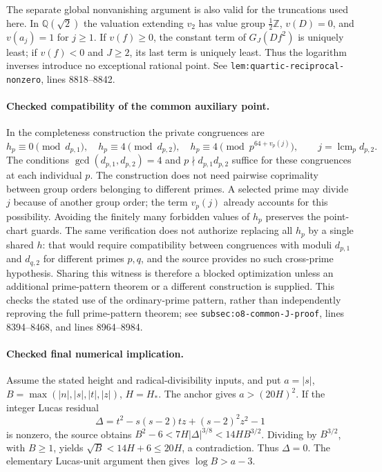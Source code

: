 \documentclass[11pt]{article}
\theoremstyle{definition}
\begin{document}
The separate global nonvanishing argument is also valid for the
truncations used here.  In $\mathbb Q(\sqrt2)$ the valuation extending
$v_2$ has value group $\frac12\mathbb Z$, $v(D)=0$, and $v(a_j)=1$
for $j\ge1$.  If $v(f)\ge0$, the constant term of $G_J(Df^2)$
is uniquely least; if $v(f)<0$ and $J\ge2$, its last term is uniquely
least.  Thus the logarithm inverses introduce no exceptional rational
point.  See \nolinkurl{lem:quartic-reciprocal-nonzero}, lines 8818--8842.

\paragraph{Checked compatibility of the common auxiliary point.}
In the completeness construction the private congruences are
\[
 h_p\equiv0\pmod{d_{p,1}},\quad
 h_p\equiv4\pmod{d_{p,2}},\quad
 h_p\equiv4\pmod{p^{64+v_p(j)}},\qquad
 j=\operatorname{lcm}_{p}d_{p,2}.
\]
The conditions $\gcd(d_{p,1},d_{p,2})=4$ and
$p\nmid d_{p,1}d_{p,2}$ suffice for these congruences at each
individual $p$.  The construction does not need pairwise coprimality
between group orders belonging to different primes.  A selected prime
may divide $j$ because of another group order; the term $v_p(j)$
already accounts for this possibility.  Avoiding the finitely many
forbidden values of $h_p$ preserves the point-chart guards.
The same verification does not authorize replacing all $h_p$ by a single
shared $h$: that would require compatibility between congruences with
moduli $d_{p,1}$ and $d_{q,2}$ for different primes $p,q$, and the source
provides no such cross-prime hypothesis.  Sharing this witness is therefore
a blocked optimization unless an additional prime-pattern theorem or a
different construction is supplied.  This checks the stated use of the
ordinary-prime pattern, rather than independently reproving the full
prime-pattern theorem; see
\texttt{subsec:o8-common-J-proof}, lines 8394--8468, and lines
8964--8984.

\paragraph{Checked final numerical implication.}
Assume the stated height and radical-divisibility inputs, and put
$a=|s|$, $B=\max(|n|,|s|,|t|,|z|)$, $H=H_*$.
The anchor gives $a>(20H)^2$.  If the integer Lucas residual
\[
 \Delta=t^2-s(s-2)tz+(s-2)^2z^2-1
\]
is nonzero, the source obtains
$B^2-6<7H|\Delta|^{3/8}<14HB^{3/2}$.
Dividing by $B^{3/2}$, with $B\ge1$, yields
$\sqrt B<14H+6\le20H$, a contradiction.  Thus $\Delta=0$.
The elementary Lucas-unit argument then gives $\log B>a-3$.
\end{document}
